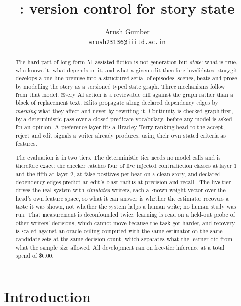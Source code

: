 \documentclass{article}
\title{\storygit: version control for story state}
\author{%
  Arush Gumber\\
  \texttt{arush23136@iiitd.ac.in}\\
}
\newcommand{\storygit}{\textsf{storygit}}
\begin{document}
\maketitle

\begin{abstract}
The hard part of long-form AI-assisted fiction is not generation but \emph{state}: what is
true, who knows it, what depends on it, and what a given edit therefore invalidates.
\storygit{} develops a one-line premise into a structured serial of episodes, scenes, beats
and prose by modelling the story as a versioned typed state graph. Three mechanisms follow
from that model. Every AI action is a reviewable diff against the graph rather than a block
of replacement text. Edits propagate along declared dependency edges by \emph{marking} what
they affect and never by rewriting it. Continuity is checked graph-first, by a deterministic
pass over a closed predicate vocabulary, before any model is asked for an opinion. A
preference layer fits a Bradley-Terry ranking head to the accept, reject and edit signals a
writer already produces, using their own stated criteria as features.

The evaluation is in two tiers. The deterministic tier needs no model calls and is therefore
exact: the checker catches four of five injected contradiction classes at layer 1 and the
fifth at layer 2, at \rCheckerFalsePositivesPerBeat{} false positives per beat on a clean
story, and declared dependency edges predict an edit's blast radius at precision
\rStaleDeclaredPrecision{} and recall \rStaleDeclaredRecall{}. The live tier drives the real
system with \emph{simulated} writers, each a known weight vector over the head's own feature
space, so what it can answer is whether the estimator recovers a taste it was shown, not
whether the system helps a human write; no human study was run. That measurement is
deconfounded twice: learning is read on a held-out probe of other writers' decisions, which
cannot move because the task got harder, and recovery is scaled against an oracle ceiling
computed with the same estimator on the same candidate sets at the same decision count,
which separates what the learner did from what the sample size allowed. All development ran
on free-tier inference at a total spend of \$0.00.
\end{abstract}

\section{Introduction}
\label{sec:intro}
\end{document}

